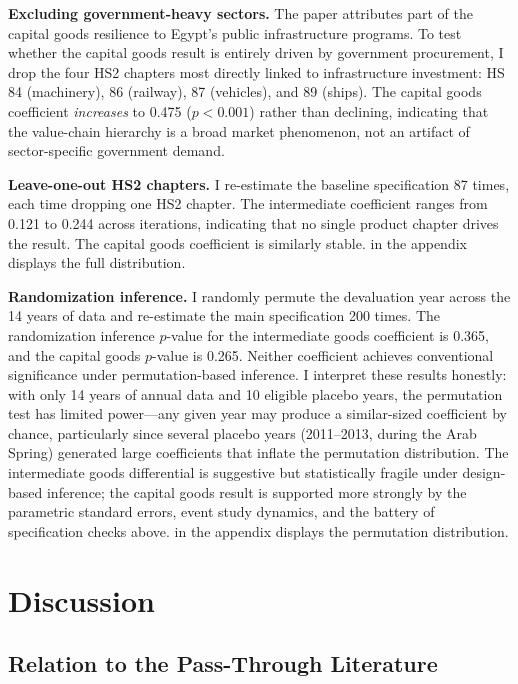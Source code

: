 \documentclass[12pt]{article}
\begin{document}
\textbf{Excluding government-heavy sectors.} The paper attributes part of the capital goods resilience to Egypt's public infrastructure programs. To test whether the capital goods result is entirely driven by government procurement, I drop the four HS2 chapters most directly linked to infrastructure investment: HS 84 (machinery), 86 (railway), 87 (vehicles), and 89 (ships). The capital goods coefficient \textit{increases} to 0.475 ($p < 0.001$) rather than declining, indicating that the value-chain hierarchy is a broad market phenomenon, not an artifact of sector-specific government demand.

\textbf{Leave-one-out HS2 chapters.} I re-estimate the baseline specification 87 times, each time dropping one HS2 chapter. The intermediate coefficient ranges from 0.121 to 0.244 across iterations, indicating that no single product chapter drives the result. The capital goods coefficient is similarly stable.  in the appendix displays the full distribution.

\textbf{Randomization inference.} I randomly permute the devaluation year across the 14 years of data and re-estimate the main specification 200 times. The randomization inference $p$-value for the intermediate goods coefficient is 0.365, and the capital goods $p$-value is 0.265. Neither coefficient achieves conventional significance under permutation-based inference. I interpret these results honestly: with only 14 years of annual data and 10 eligible placebo years, the permutation test has limited power---any given year may produce a similar-sized coefficient by chance, particularly since several placebo years (2011--2013, during the Arab Spring) generated large coefficients that inflate the permutation distribution. The intermediate goods differential is suggestive but statistically fragile under design-based inference; the capital goods result is supported more strongly by the parametric standard errors, event study dynamics, and the battery of specification checks above.  in the appendix displays the permutation distribution.


\section{Discussion}

\subsection{Relation to the Pass-Through Literature}
\end{document}
